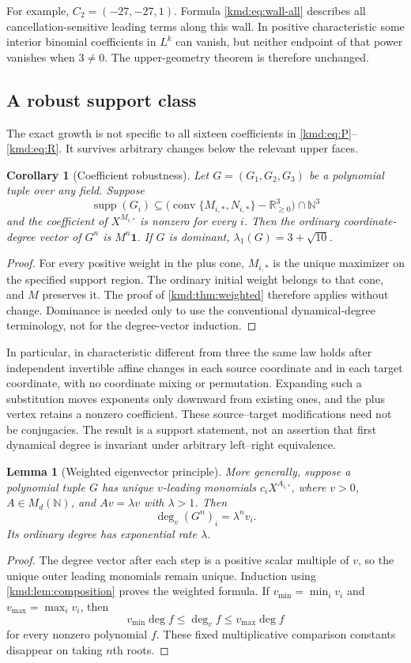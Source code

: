 \documentclass[11pt,a4paper]{article}
\numberwithin{equation}{section}
\newtheorem{lemma}[theorem]{Lemma}
\newtheorem{corollary}[theorem]{Corollary}
\theoremstyle{definition}
\theoremstyle{remark}
\newcommand{\R}{\mathbb R}
\newcommand{\N}{\mathbb N}
\newcommand{\one}{\mathbf 1}
\newcommand{\dd}{\operatorname{deg}}
\newcommand{\conv}{\operatorname{conv}}
\newcommand{\supp}{\operatorname{supp}}
\begin{document}
For example, $C_2=(-27,-27,1)$. Formula \eqref{kmd:eq:wall-all} describes
all cancellation-sensitive leading terms along this wall. In
positive characteristic some interior binomial coefficients in
$L^k$ can vanish, but neither endpoint of that power vanishes when
$3\ne0$. The upper-geometry theorem is therefore unchanged.

\subsection{A robust support class}
The exact growth is not specific to all sixteen coefficients in
\eqref{kmd:eq:P}--\eqref{kmd:eq:R}. It survives arbitrary changes below the
relevant upper faces.

\begin{corollary}[Coefficient robustness]\label{kmd:cor:robust}
Let $G=(G_1,G_2,G_3)$ be a polynomial tuple over any field. Suppose
\[
 \supp(G_i)\subseteq
 \bigl(\conv\{M_{i,*},N_{i,*}\}-\R_{\ge0}^3\bigr)\cap\N^3
\]
and the coefficient of $X^{M_{i,*}}$ is nonzero for every $i$.
Then the ordinary coordinate-degree vector of $G^n$ is $M^n\one$.
If $G$ is dominant, $\lambda_1(G)=3+\sqrt{10}$.
\end{corollary}
\begin{proof}
For every positive weight in the plus cone, $M_{i,*}$ is the unique
maximizer on the specified support region. The ordinary initial
weight belongs to that cone, and $M$ preserves it. The proof of
\cref{kmd:thm:weighted} therefore applies without change. Dominance is
needed only to use the conventional dynamical-degree terminology,
not for the degree-vector induction.
\end{proof}

In particular, in characteristic different from three the same law
holds after independent invertible affine changes in each source
coordinate and in each target coordinate, with no coordinate mixing
or permutation. Expanding such a substitution moves exponents only
downward from existing ones, and the plus vertex retains a nonzero
coefficient. These source--target modifications need not be
conjugacies. The result is a support statement, not an assertion that
first dynamical degree is invariant under arbitrary left--right
equivalence.

\begin{lemma}[Weighted eigenvector principle]\label{kmd:lem:eigen}
More generally, suppose a polynomial tuple $G$ has unique
$v$-leading monomials $c_iX^{A_{i,*}}$, where $v>0$,
$A\in M_d(\N)$, and $Av=\lambda v$ with $\lambda>1$. Then
\[
 \dd_v(G^n)_i=\lambda^n v_i.
\]
Its ordinary degree has exponential rate $\lambda$.
\end{lemma}
\begin{proof}
The degree vector after each step is a positive scalar multiple of
$v$, so the unique outer leading monomials remain unique. Induction
using \cref{kmd:lem:composition} proves the weighted formula. If
$v_{\min}=\min_i v_i$ and $v_{\max}=\max_i v_i$, then
\[
 v_{\min}\dd f\le\dd_v f\le v_{\max}\dd f
\]
for every nonzero polynomial $f$. These fixed multiplicative
comparison constants disappear on taking $n$th roots.
\end{proof}
\end{document}
